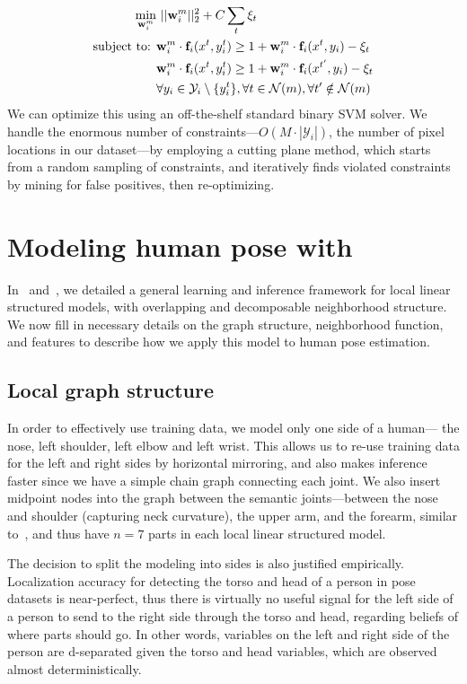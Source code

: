 \begin{align}
\min_{\mathbf{w}_i^m}&~||\mathbf{w}_i^m||_2^2 + C \sum_{t} \xi_t\\
\text{subject to: }
& \mathbf{w}_i^m \cdot \mathbf{f}_i(x^t,y_i^t) \geq 1+\mathbf{w}_i^m \cdot \mathbf{f}_i(x^t,y_i)-\xi_t 
\nonumber \\
& \mathbf{w}_i^m \cdot \mathbf{f}_i(x^t,y_i^t) \geq 1+\mathbf{w}_i^m \cdot \mathbf{f}_i(x^{t'},y_i)-\xi_t 
\nonumber \\
&\forall y_i \in \mathcal{Y}_i\setminus \{y_i^t\}, \forall t \in 
\mathcal{N}(m), \forall t' \notin \mathcal{N}(m) \nonumber
\end{align}
We can optimize this using an off-the-shelf standard binary SVM solver.  We 
handle the enormous number of constraints---$O(M \cdot |\mathcal{Y}_i|)$, the 
number of pixel locations in our dataset---by employing a cutting plane method, 
which starts from a random sampling of constraints, and iteratively finds 
violated constraints by mining for false positives, then re-optimizing.

	

\section{Modeling human pose with \LLPS}
In~ and~, we detailed a general 
learning and inference framework for local linear structured models, with 
overlapping and decomposable neighborhood structure.  We now fill in necessary 
details on the graph structure, neighborhood function, and features to describe 
how we apply this model to human pose estimation.
\subsection{Local graph structure}
In order to effectively use training data, we model only one side of a human--- 
the nose, left shoulder, left elbow and left wrist. This allows us to re-use 
training data for the left and right sides by horizontal mirroring, and also 
makes inference faster since we have a simple chain graph connecting each 
joint.  We also insert midpoint nodes into the graph between the semantic 
joints---between the nose and shoulder  (capturing neck curvature), the upper 
arm, and the forearm, similar to~\citet{deva2011}, and thus have $n=7$ parts in 
each local linear structured model.

The decision to split the modeling into sides is also justified empirically.  
Localization accuracy for detecting the torso and head of a person in pose
datasets is near-perfect, thus there is virtually no useful signal for the left 
side of a person to send to the right side through the torso and head, 
regarding beliefs of where parts should go.  In other words, variables on the 
left and right side of the person are d-separated given the torso and head 
variables, which are observed almost deterministically.

